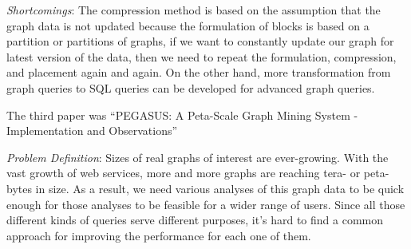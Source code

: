 \begin{itemize*}
\item {\em Shortcomings}:
      The compression method is based on the assumption that the graph data is not updated because the formulation of blocks is based on a partition or partitions of graphs, if we want to constantly update our graph for latest version of the data, then we need to repeat the formulation, compression, and placement again and again. On the other hand, more transformation from graph queries to SQL queries can be developed for advanced graph queries.
\end{itemize*}

\newpage
The third paper was ``PEGASUS: A Peta-Scale Graph Mining System - Implementation and Observations''
\begin{itemize*}
\item {\em Problem Definition}: Sizes of real graphs of interest are ever-growing. With the vast growth of web services, more and more graphs are reaching tera- or peta-bytes in size. As a result, we need various analyses of this graph data to be quick enough for those analyses to be feasible for a wider range of users.  Since all those different kinds of queries serve different purposes, it’s hard to find a common approach for improving the performance for each one of them.\\


\end{itemize*}
